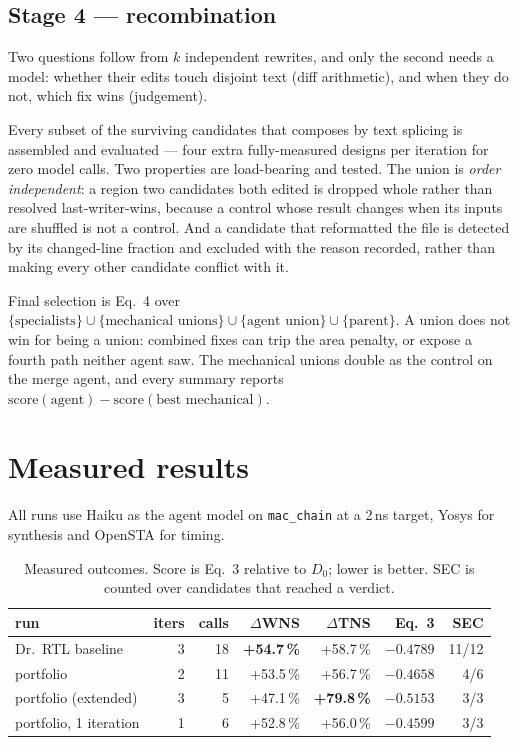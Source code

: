 \documentclass[11pt,a4paper]{article}
\begin{document}
\subsection{Stage 4 --- recombination}

Two questions follow from $k$ independent rewrites, and only the second needs a
model: whether their edits touch disjoint text (diff arithmetic), and when they
do not, which fix wins (judgement).

Every subset of the surviving candidates that composes by text splicing is
assembled and evaluated --- four extra fully-measured designs per iteration for
zero model calls. Two properties are load-bearing and tested. The union is
\emph{order independent}: a region two candidates both edited is dropped whole
rather than resolved last-writer-wins, because a control whose result changes
when its inputs are shuffled is not a control. And a candidate that reformatted
the file is detected by its changed-line fraction and excluded with the reason
recorded, rather than making every other candidate conflict with it.

Final selection is Eq.~4 over
$\{\text{specialists}\} \cup \{\text{mechanical unions}\} \cup \{\text{agent
union}\} \cup \{\text{parent}\}$. A union does not win for being a union:
combined fixes can trip the area penalty, or expose a fourth path neither agent
saw. The mechanical unions double as the control on the merge agent, and every
summary reports
$\mathrm{score}(\text{agent}) - \mathrm{score}(\text{best mechanical})$.

\section{Measured results}

All runs use Haiku as the agent model on \texttt{mac\_chain} at a 2\,ns target,
Yosys for synthesis and OpenSTA for timing.

\begin{table}[h]
\centering
\caption{Measured outcomes. Score is Eq.~3 relative to $D_0$; lower is better.
SEC is counted over candidates that reached a verdict.}
\label{tab:results}
\begin{tabular}{@{}lrrrrrr@{}}
\toprule
run & iters & calls & $\Delta$WNS & $\Delta$TNS & Eq.~3 & SEC \\
\midrule
Dr.\ RTL baseline            & 3 & 18 & \textbf{+54.7\,\%} & +58.7\,\% & $-0.4789$ & 11/12 \\
portfolio                    & 2 & 11 & +53.5\,\% & +56.7\,\% & $-0.4658$ & 4/6 \\
portfolio (extended)         & 3 &  5 & +47.1\,\% & \textbf{+79.8\,\%} & $\mathbf{-0.5153}$ & 3/3 \\
portfolio, 1 iteration       & 1 &  6 & +52.8\,\% & +56.0\,\% & $-0.4599$ & 3/3 \\
\bottomrule
\end{tabular}
\end{table}
\end{document}
